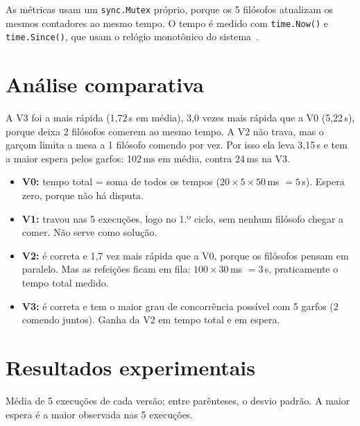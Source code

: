 \documentclass[11pt,a4paper]{article}
\begin{document}
As métricas usam um \texttt{sync.Mutex} próprio, porque os 5 filósofos atualizam os mesmos
contadores ao mesmo tempo. O tempo é medido com \texttt{time.Now()} e \texttt{time.Since()}, que usam o relógio monotônico do sistema~\cite{gotime}.

\section*{Análise comparativa}

A V3 foi a mais rápida (1,72\,s em média), 3,0 vezes mais rápida que a V0 (5,22\,s), porque
deixa 2 filósofos comerem ao mesmo tempo. A V2 não trava, mas o garçom limita a mesa a 1
filósofo comendo por vez. Por isso ela leva 3,15\,s e tem a maior espera pelos garfos:
102\,ms em média, contra 24\,ms na V3.

\begin{itemize}
  \item \textbf{V0:} tempo total = soma de todos os tempos ($20 \times 5 \times 50$\,ms $= 5$\,s).
        Espera zero, porque não há disputa.
  \item \textbf{V1:} travou nas 5 execuções, logo no 1.º ciclo, sem nenhum filósofo
        chegar a comer. Não serve como solução.
  \item \textbf{V2:} é correta e 1,7 vez mais rápida que a V0, porque os filósofos pensam em
        paralelo. Mas as refeições ficam em fila: $100 \times 30$\,ms $= 3$\,s, praticamente o
        tempo total medido.
  \item \textbf{V3:} é correta e tem o maior grau de concorrência possível com 5 garfos
        (2 comendo juntos). Ganha da V2 em tempo total e em espera.
\end{itemize}

\newpage
\section*{Resultados experimentais}

Média de 5 execuções de cada versão; entre parênteses, o desvio padrão. A maior espera é a
maior observada nas 5 execuções.
\end{document}
